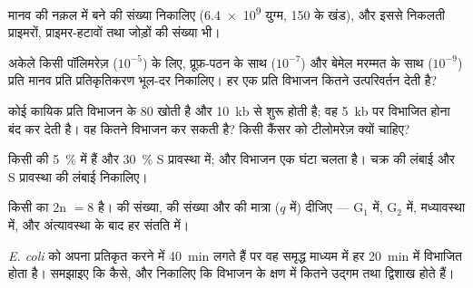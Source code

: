 \begin{exercise}[$\star\star$]\label{exo:b1:replication-mitosis:5}
मानव  की नक़ल में बने  की संख्या निकालिए
(\num{6.4e9} युग्म, \qty{150}{} के खंड), और इससे निकलती प्राइमरों,
प्राइमर-हटावों तथा जोड़ों की संख्या भी।
\end{exercise}

\begin{exercise}[$\star\star$]\label{exo:b1:replication-mitosis:6}
अकेले किसी पॉलिमरेज़ ($10^{-5}$) के लिए, प्रूफ़-पठन के साथ ($10^{-7}$)
और बेमेल मरम्मत के साथ ($10^{-9}$) प्रति मानव  प्रति प्रतिकृतिकरण
भूल-दर निकालिए। हर एक प्रति विभाजन कितने उत्परिवर्तन देती है?
\end{exercise}

\begin{exercise}[$\star\star$]\label{exo:b1:replication-mitosis:7}
कोई कायिक  प्रति विभाजन  के \qty{80}{}  खोती
है और \qty{10}{kb} से शुरू होती है; वह \qty{5}{kb} पर विभाजित होना बंद
कर देती है। वह कितने विभाजन कर सकती है? किसी कैंसर  को टीलोमरेज़
क्यों चाहिए?
\end{exercise}

\begin{exercise}[$\star\star$]\label{exo:b1:replication-mitosis:8}
किसी  की \qty{5}{\%}   में हैं और \qty{30}{\%}
S प्रावस्था में; और विभाजन एक घंटा चलता है। चक्र की लंबाई और S प्रावस्था
की लंबाई निकालिए।
\end{exercise}

\begin{exercise}[$\star\star$]\label{exo:b1:replication-mitosis:9}
किसी  का 2n $= 8$ है।  की संख्या,  की
संख्या और  की मात्रा ($q$ में) दीजिए --- G$_1$ में, G$_2$ में,
मध्यावस्था में, और अंत्यावस्था के बाद हर संतति में।
\end{exercise}

\begin{exercise}[$\star\star\star$]\label{exo:b1:replication-mitosis:10}
\emph{E. coli} को अपना  प्रतिकृत करने में \qty{40}{min} लगते हैं
पर वह समृद्ध माध्यम में हर \qty{20}{min} में विभाजित होता है। समझाइए कि
कैसे, और निकालिए कि विभाजन के क्षण  में कितने उद्गम तथा द्विशाख
होते हैं।
\end{exercise}

